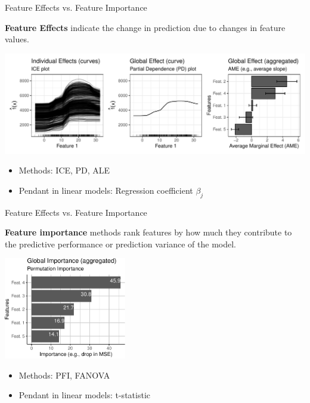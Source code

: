 \documentclass[11pt,compress,t,notes=noshow, aspectratio=169, xcolor=table]{beamer}
\begin{document}
\begin{frame}{Feature Effects vs. Feature Importance}

	\textbf{Feature Effects} indicate the change in prediction due to changes in feature values.
	\medskip
	\begin{center}
		\includegraphics[page=1, width=\textwidth]{figure/feature-effect}
	\end{center}
	\begin{itemize}
		\item Methods: ICE, PD, ALE
		\item Pendant in linear models: Regression coefficient $\beta_j$
	\end{itemize}
\end{frame}

\begin{frame}{Feature Effects vs. Feature Importance}

	\textbf{Feature importance} methods rank features by how much they contribute to the predictive performance or prediction variance of the model.
	\begin{center}
		\includegraphics[page=1, width=0.4\textwidth]{figure/feature-importance}
	\end{center}
	\begin{itemize}
		\item Methods: PFI, FANOVA
		\item Pendant in linear models: t-statistic
	\end{itemize}

\end{frame}
\end{document}
